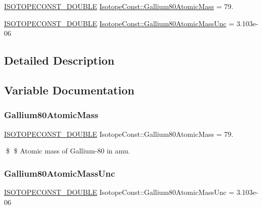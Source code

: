 \begin{DoxyCompactItemize}
\item 
\mbox{\hyperlink{group___isotope_const-_macros_ga8f45a7272ce02c0b4c65c44636ed719a}{I\+S\+O\+T\+O\+P\+E\+C\+O\+N\+S\+T\+\_\+\+D\+O\+U\+B\+LE}} \mbox{\hyperlink{group___isotope_const-_gallium-_ga80_ga4e7ea3f4a6560825a4fc27918f7bd602}{Isotope\+Const\+::\+Gallium80\+Atomic\+Mass}} = 79.
\item 
\mbox{\hyperlink{group___isotope_const-_macros_ga8f45a7272ce02c0b4c65c44636ed719a}{I\+S\+O\+T\+O\+P\+E\+C\+O\+N\+S\+T\+\_\+\+D\+O\+U\+B\+LE}} \mbox{\hyperlink{group___isotope_const-_gallium-_ga80_gaefe645f91df89dff9dc5e8e9b888b1c4}{Isotope\+Const\+::\+Gallium80\+Atomic\+Mass\+Unc}} = 3.\+103e-\/06
\end{DoxyCompactItemize}


\subsection{Detailed Description}


\subsection{Variable Documentation}
\mbox{\label{group___isotope_const-_gallium-_ga80_ga4e7ea3f4a6560825a4fc27918f7bd602}} 
\subsubsection{\texorpdfstring{Gallium80\+Atomic\+Mass}{Gallium80AtomicMass}}
{\footnotesize\ttfamily \mbox{\hyperlink{group___isotope_const-_macros_ga8f45a7272ce02c0b4c65c44636ed719a}{I\+S\+O\+T\+O\+P\+E\+C\+O\+N\+S\+T\+\_\+\+D\+O\+U\+B\+LE}} Isotope\+Const\+::\+Gallium80\+Atomic\+Mass = 79.}

\$ \$ Atomic mass of Gallium-\/80 in amu. \mbox{\label{group___isotope_const-_gallium-_ga80_gaefe645f91df89dff9dc5e8e9b888b1c4}} 
\subsubsection{\texorpdfstring{Gallium80\+Atomic\+Mass\+Unc}{Gallium80AtomicMassUnc}}
{\footnotesize\ttfamily \mbox{\hyperlink{group___isotope_const-_macros_ga8f45a7272ce02c0b4c65c44636ed719a}{I\+S\+O\+T\+O\+P\+E\+C\+O\+N\+S\+T\+\_\+\+D\+O\+U\+B\+LE}} Isotope\+Const\+::\+Gallium80\+Atomic\+Mass\+Unc = 3.\+103e-\/06}

